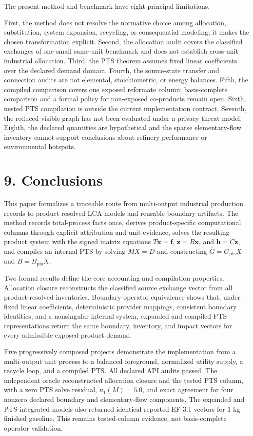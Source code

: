 \documentclass[
  10pt,
  a4paper,
  DIV=11,
  numbers=noendperiod]{scrartcl}
\begin{document}
The present method and benchmark have eight principal limitations.

First, the method does not resolve the normative choice among
allocation, substitution, system expansion, recycling, or consequential
modeling; it makes the chosen transformation explicit. Second, the
allocation audit covers the classified exchanges of one small same-unit
benchmark and does not establish cross-unit industrial allocation.
Third, the PTS theorem assumes fixed linear coefficients over the
declared demand domain. Fourth, the source-state transfer and connection
audits are not elemental, stoichiometric, or energy balances. Fifth, the
compiled comparison covers one exposed reformate column; basis-complete
comparison and a formal policy for non-exposed co-products remain open.
Sixth, nested PTS compilation is outside the current implementation
contract. Seventh, the reduced visible graph has not been evaluated
under a privacy threat model. Eighth, the declared quantities are
hypothetical and the sparse elementary-flow inventory cannot support
conclusions about refinery performance or environmental hotspots.

\section{9. Conclusions}\label{conclusions}

This paper formalizes a traceable route from multi-output industrial
production records to product-resolved LCA models and reusable boundary
artifacts. The method records total-process facts once, derives
product-specific computational columns through explicit attribution and
unit evidence, solves the resulting product system with the signed
matrix equations \(T\mathbf x=\mathbf f\), \(\mathbf z=B\mathbf x\), and
\(\mathbf h=C\mathbf z\), and compiles an internal PTS by solving
\(MX=D\) and constructing \(\overline G=G_{\mathrm{pts}}X\) and
\(\overline B=B_{\mathrm{pts}}X\).

Two formal results define the core accounting and compilation
properties. Allocation closure reconstructs the classified source
exchange vector from all product-resolved inventories. Boundary-operator
equivalence shows that, under fixed linear coefficients, deterministic
provider mappings, consistent boundary identities, and a nonsingular
internal system, expanded and compiled PTS representations return the
same boundary, inventory, and impact vectors for every admissible
exposed-product demand.

Five progressively composed projects demonstrate the implementation from
a multi-output unit process to a balanced foreground, normalized utility
supply, a recycle loop, and a compiled PTS. All declared API audits
passed. The independent oracle reconstructed allocation closure and the
tested PTS column, with a zero PTS solve residual, \(\kappa_1(M)=5.0\),
and exact agreement for four nonzero declared boundary and
elementary-flow components. The expanded and PTS-integrated models also
returned identical reported EF 3.1 vectors for 1 kg finished gasoline.
This remains tested-column evidence, not basis-complete operator
validation.
\end{document}
